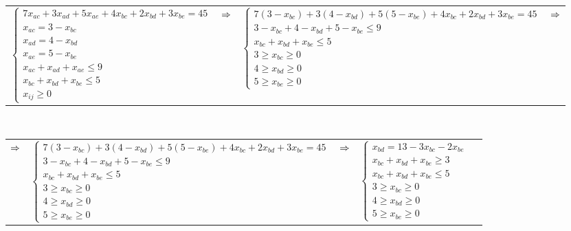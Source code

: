 \documentclass{article}
\begin{document}
	\begin{center}
	\begin{tabular}{cccc}
		$\begin{cases}
		7x_{ac} + 3x_{ad} + 5x_{ae} + 4x_{bc} + 2x_{bd} + 3x_{be} = 45 \\
		x_{ac} = 3 - x_{bc}\\
		x_{ad} = 4 - x_{bd}\\
		x_{ae} = 5 - x_{be}\\
		x_{ac} + x_{ad} + x_{ae} \leq 9 \\
		x_{bc} + x_{bd} + x_{be} \leq 5 \\
		x_{ij} \geq 0
		\end{cases}$
		& $\hfill \Rightarrow \hfill$ &
		$\begin{cases}
		7(3 - x_{bc}) + 3(4 - x_{bd}) + 5(5 - x_{be}) + 4x_{bc} + 2x_{bd} + 3x_{be} = 45 \\
		3 - x_{bc} + 4 - x_{bd} + 5 - x_{be} \leq 9 \\
		x_{bc} + x_{bd} + x_{be} \leq 5 \\
		3 \geq x_{bc} \geq 0\\
		4 \geq x_{bd} \geq 0\\
		5 \geq x_{be} \geq 0
		\end{cases}$
		& $\hfill \Rightarrow \hfill$
	\end{tabular}\\
		\begin{tabular}{ccccc}
			$\hfill \Rightarrow \hfill$ &
			$\begin{cases}
			7(3 - x_{bc}) + 3(4 - x_{bd}) + 5(5 - x_{be}) + 4x_{bc} + 2x_{bd} + 3x_{be} = 45 \\
			3 - x_{bc} + 4 - x_{bd} + 5 - x_{be} \leq 9 \\
			x_{bc} + x_{bd} + x_{be} \leq 5 \\
			3 \geq x_{bc} \geq 0 \\
			4 \geq x_{bd} \geq 0 \\
			5 \geq x_{be} \geq 0 
			\end{cases}$
			& $\hfill \Rightarrow \hfill$ &
			$\begin{cases}
			x_{bd} = 13 - 3x_{bc} - 2x_{be}  \\
			x_{bc} + x_{bd} + x_{be} \geq 3 \\
			x_{bc} + x_{bd} + x_{be} \leq 5 \\
			3 \geq x_{bc} \geq 0 \\
			4 \geq x_{bd} \geq 0 \\
			5 \geq x_{be} \geq 0 
			\end{cases}$

\end{tabular}
\end{center}
\end{document}

